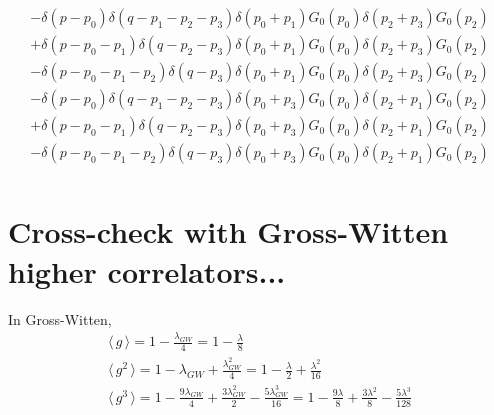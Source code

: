 \documentclass[12pt]{article}
\newcommand{\lr}[1]{ \left( #1 \right) }
\newcommand{\vev}[1]{ \langle \, #1 \, \rangle }
\begin{document}
\begin{eqnarray}
\label{simplify1}
 -\delta\lr{p - p_0} \delta\lr{q - p_1 - p_2 - p_3}
  \delta\lr{p_0 + p_1} G_0\lr{p_0} \delta\lr{p_2 + p_3} G_0\lr{p_2}
 \nonumber \\
 +\delta\lr{p - p_0 - p_1} \delta\lr{q - p_2 - p_3}
  \delta\lr{p_0 + p_1} G_0\lr{p_0} \delta\lr{p_2 + p_3} G_0\lr{p_2}
 \nonumber \\
 -\delta\lr{p - p_0 - p_1 - p_2} \delta\lr{q - p_3}
  \delta\lr{p_0 + p_1} G_0\lr{p_0} \delta\lr{p_2 + p_3} G_0\lr{p_2}
 \nonumber \\
 -\delta\lr{p - p_0} \delta\lr{q - p_1 - p_2 - p_3}
  \delta\lr{p_0 + p_3} G_0\lr{p_0} \delta\lr{p_2 + p_1} G_0\lr{p_2}
 \nonumber \\
 +\delta\lr{p - p_0 - p_1} \delta\lr{q - p_2 - p_3}
  \delta\lr{p_0 + p_3} G_0\lr{p_0} \delta\lr{p_2 + p_1} G_0\lr{p_2}
 \nonumber \\
 -\delta\lr{p - p_0 - p_1 - p_2} \delta\lr{q - p_3}
  \delta\lr{p_0 + p_3} G_0\lr{p_0} \delta\lr{p_2 + p_1} G_0\lr{p_2}
 \nonumber \\
\end{eqnarray}

\section{Cross-check with Gross-Witten higher correlators...}

In Gross-Witten,
\begin{eqnarray}
 \vev{g}   = 1 - \frac{\lambda_{GW}}{4} = 1 - \frac{\lambda}{8}
 \nonumber \\
 \vev{g^2} = 1 - \lambda_{GW} + \frac{\lambda_{GW}^2}{4} = 1 - \frac{\lambda}{2} + \frac{\lambda^2}{16}
\nonumber \\
 \vev{g^3} = 1 - \frac{9 \lambda_{GW}}{4} + \frac{3 \lambda_{GW}^2}{2} - \frac{5 \lambda_{GW}^3}{16} = 1 - \frac{9 \lambda}{8} + \frac{3 \lambda^2}{8} - \frac{5 \lambda^3}{128}
\end{eqnarray}
\end{document}
